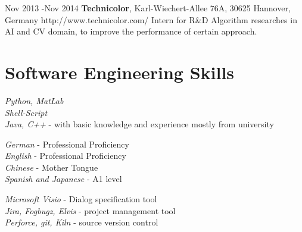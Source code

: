 \documentclass[10pt]{article} %
\begin{document}

\job
{Nov 2013 -}{Nov 2014}
{{\bf Technicolor}, Karl-Wiechert-Allee 76A, 30625 Hannover, Germany}
{http://www.technicolor.com/}
{Intern for R\&D}
{Algorithm researches in AI and CV domain, to improve the performance of certain approach.} 


\section{Software Engineering Skills}

{
\textit{Python, MatLab}\\
\textit{Shell-Script}\\
\textit{Java, C++} - with basic knowledge and experience mostly from university\\
}


{
\textit{German} - Professional Proficiency\\
\textit{English} - Professional Proficiency\\
\textit{Chinese} - Mother Tongue\\
\textit{Spanish and Japanese} - A1 level\\
}


{
\textit{Microsoft Visio} - Dialog specification tool\\
\textit{Jira, Fogbugz, Elvis} - project management tool\\
\textit{Perforce, git, Kiln} - source version control \\
}
\end{document}
